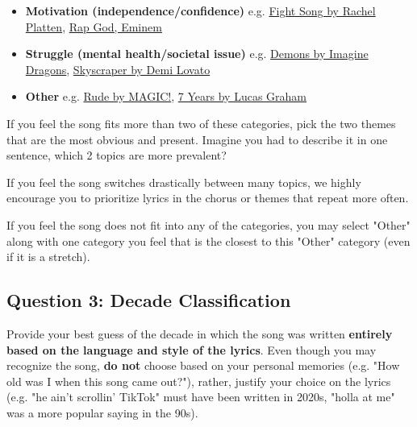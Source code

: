 \documentclass{article}
\begin{document}
\begin{itemize}
    \item \textbf{Motivation (independence/confidence)} e.g. \href{https://www.youtube.com/watch?v=xo1VInw-SKc}{Fight Song by Rachel Platten}, \href{https://www.youtube.com/watch?v=XbGs_qK2PQA}{Rap God, Eminem}
    \item \textbf{Struggle (mental health/societal issue)} e.g. \href{https://www.youtube.com/watch?v=mWRsgZuwf_8}{Demons by Imagine Dragons}, \href{https://www.youtube.com/watch?v=r_8ydghbGSg}{Skyscraper by Demi Lovato}
    \item \textbf{Other} e.g. \href{https://www.youtube.com/watch?v=PIh2xe4jnpk}{Rude by MAGIC!}, \href{https://www.youtube.com/watch?v=LHCob76kigA}{7 Years by Lucas Graham}
\end{itemize}

If you feel the song fits more than two of these categories, pick the two themes that are the most obvious and present. Imagine you had to describe it in one sentence, which 2 topics are more prevalent?

If you feel the song switches drastically between many topics, we highly encourage you to prioritize lyrics in the chorus or themes that repeat more often.

If you feel the song does not fit into any of the categories, you may select "Other" along with one category you feel that is the closest to this "Other" category (even if it is a stretch).

\subsection{Question 3: Decade Classification}
Provide your best guess of the decade in which the song was written \textbf{entirely based on the language and style of the lyrics}. Even though you may recognize the song, \textbf{do not} choose based on your personal memories (e.g. "How old was I when this song came out?"), rather, justify your choice on the lyrics (e.g. "he ain't scrollin' TikTok" must have been written in 2020s, "holla at me" was a more popular saying in the 90s).
\end{document}
